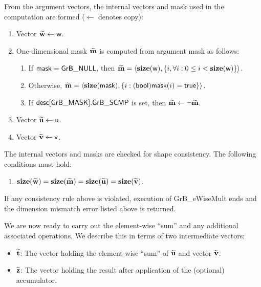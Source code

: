 From the argument vectors, the internal vectors and mask used in 
the computation are formed ($\leftarrow$ denotes copy):
\begin{enumerate}
	\item Vector ${\bf \widetilde{w}} \leftarrow {\sf w}$.

	\item One-dimensional mask ${\bf \widetilde{m}}$ is computed from 
    argument {\sf mask} as follows:
	\begin{enumerate}
		\item	If ${\sf mask} = {\sf GrB\_NULL}$, then ${\bf \widetilde{m}} = 
        \langle \bold{size}({\sf w}), \{i, \forall i : 0 \leq i < 
        \bold{size}({\sf w}) \} \rangle$.

		\item	Otherwise, ${\bf \widetilde{m}} = 
        \langle \bold{size}({\sf mask}), \{i : ({\sf bool}){\sf mask}(i) = 
        {\sf true}\} \rangle$.

		\item	If ${\sf desc[GrB\_MASK].GrB\_SCMP}$ is set, then ${\bf \widetilde{m}} \leftarrow \neg {\bf \widetilde{m}}$.
	\end{enumerate}

	\item Vector ${\bf \widetilde{u}} \leftarrow {\sf u}$.

	\item Vector ${\bf \widetilde{v}} \leftarrow {\sf v}$.
\end{enumerate}

The internal vectors and masks are checked for shape consistency. The following 
conditions must hold:
\begin{enumerate}
	\item $\bold{size}({\bf \widetilde{w}}) = \bold{size}({\bf \widetilde{m}})
    = \bold{size}({\bf \widetilde{u}}) = \bold{size}({\bf \widetilde{v}})$.
\end{enumerate}
If any consistency rule above is violated, execution of {\sf GrB\_eWiseMult} ends and 
the dimension mismatch error listed above is returned.

We are now ready to carry out the element-wise ``sum'' and any additional 
associated operations.  We describe this in terms of two intermediate vectors:
\begin{itemize}
	\item ${\bf \widetilde{t}}$: The vector holding the element-wise ``sum'' of
    ${\bf \widetilde{u}}$ and vector ${\bf \widetilde{v}}$.
	\item ${\bf \widetilde{z}}$: The vector holding the result after 
    application of the (optional) accumulator.
\end{itemize}

